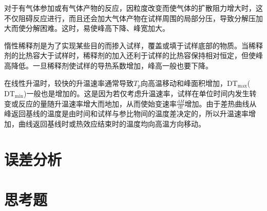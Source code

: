 \documentclass[a4paper]{article}
\begin{document}
对于有气体参加或有气体产物的反应，因粒度改变而使气体的扩散阻力增大时，这不仅阻碍反应进行，而且还会加大气体产物在试样周围的局部分压，导致分解压加大而使分解困难。这时，易使峰高下降、峰宽加大。

惰性稀释剂是为了实现某些目的而掺入试样，覆盖或填于试样底部的物质。当稀释剂的比热容大于试样时，稀释剂的加入还利于试样的比热容保持相对恒定，但使峰高降低。一旦稀释剂使试样的导热系数增加，峰高一般也要下降。

在线性升温时，较快的升温速率通常导致$T_p$向高温移动和峰面积增加，$\text{DT}_{\text{max}}$($\text{DT}_{\text{min}}$)一般也是增加的。这是因为若仅考虑升温速率，试样在单位时间内发生转变或反应的量随升温速率增大而地加，从而使始变速率$\frac{\text{d}H}{\text{d}t}$增加。由于差热曲线从峰返回基线的温度是由时间和试样与参比物间的温度差决定的，所以升温速率增加，曲线返回基线时或热效应结束时的温度均向高温方向移动。
\fi

\section{误差分析}

\section{思考题}
\end{document}
